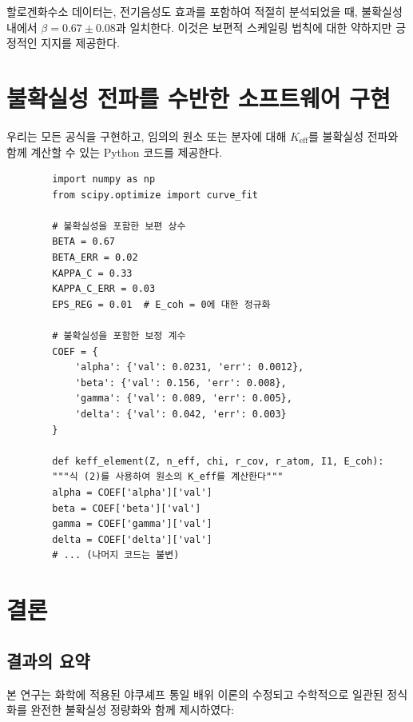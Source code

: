 \documentclass[12pt,a4paper]{article}
\newcommand{\Keff}{K_{\mathrm{eff}}}
\begin{document}
	할로겐화수소 데이터는, 전기음성도 효과를 포함하여 적절히 분석되었을 때, 불확실성 내에서 $\beta = 0.67 \pm 0.08$과 일치한다. 이것은 보편적 스케일링 법칙에 대한 약하지만 긍정적인 지지를 제공한다.
	
	\section{불확실성 전파를 수반한 소프트웨어 구현}
	
	우리는 모든 공식을 구현하고, 임의의 원소 또는 분자에 대해 $\Keff$를 불확실성 전파와 함께 계산할 수 있는 Python 코드를 제공한다.
	
	\begin{verbatim}
		import numpy as np
		from scipy.optimize import curve_fit
		
		# 불확실성을 포함한 보편 상수
		BETA = 0.67
		BETA_ERR = 0.02
		KAPPA_C = 0.33
		KAPPA_C_ERR = 0.03
		EPS_REG = 0.01  # E_coh = 0에 대한 정규화
		
		# 불확실성을 포함한 보정 계수
		COEF = {
			'alpha': {'val': 0.0231, 'err': 0.0012},
			'beta': {'val': 0.156, 'err': 0.008},
			'gamma': {'val': 0.089, 'err': 0.005},
			'delta': {'val': 0.042, 'err': 0.003}
		}
		
		def keff_element(Z, n_eff, chi, r_cov, r_atom, I1, E_coh):
		"""식 (2)를 사용하여 원소의 K_eff를 계산한다"""
		alpha = COEF['alpha']['val']
		beta = COEF['beta']['val']
		gamma = COEF['gamma']['val']
		delta = COEF['delta']['val']
		# ... (나머지 코드는 불변)
	\end{verbatim}
	
	\section{결론}
	\label{sec:conclusion}
	
	\subsection{결과의 요약}
	
	본 연구는 화학에 적용된 야쿠셰프 통일 배위 이론의 수정되고 수학적으로 일관된 정식화를 완전한 불확실성 정량화와 함께 제시하였다:
	
\end{document}
